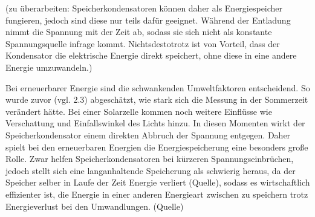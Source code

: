         
        
        
        
        \par (zu überarbeiten: Speicherkondensatoren können daher als Energiespeicher fungieren, jedoch sind diese nur teils dafür geeignet. Während der Entladung nimmt die Spannung mit der Zeit ab, sodass sie sich nicht als konstante Spannungsquelle infrage kommt.
        Nichtsdestotrotz ist von Vorteil, dass der Kondensator die elektrische Energie direkt speichert, ohne diese in eine andere Energie umzuwandeln.)

        
        
        
        \par Bei erneuerbarer Energie sind die schwankenden Umweltfaktoren entscheidend. So wurde zuvor (vgl. 2.3) abgeschätzt, wie stark sich die Messung in der Sommerzeit verändert hätte. Bei einer Solarzelle kommen noch weitere Einflüsse wie Verschattung und Einfallswinkel des Lichts hinzu. In diesen Momenten wirkt der Speicherkondensator einem direkten Abbruch der Spannung entgegen. Daher spielt bei den erneuerbaren Energien die Energiespeicherung eine besonders große Rolle. Zwar helfen Speicherkondensatoren bei kürzeren Spannungseinbrüchen, jedoch stellt sich eine langanhaltende Speicherung als schwierig heraus, da der Speicher selber in Laufe der Zeit Energie verliert (Quelle), sodass es wirtschaftlich effizienter ist, die Energie in einer anderen Energieart zwischen zu speichern trotz Energieverlust bei den Umwandlungen. (Quelle) 


